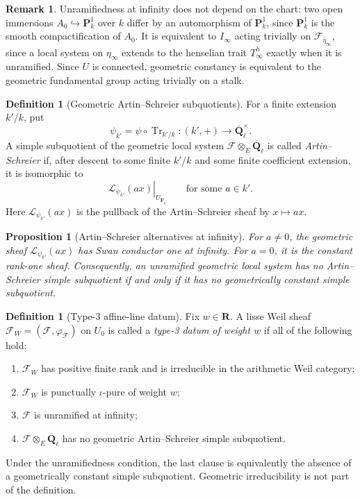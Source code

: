 \documentclass[10pt]{article}
\newtheorem{proposition}[theorem]{Proposition}
\theoremstyle{definition}
\newtheorem{definition}[theorem]{Definition}
\newtheorem{remark}[theorem]{Remark}
\newcommand{\Fbar}{\overline{\mathbf F}_q}
\newcommand{\Qlb}{\overline{\mathbf Q}_\ell}
\newcommand{\Pone}{\mathbf P^1}
\newcommand{\Tr}{\operatorname{Tr}}
\begin{document}
\begin{remark}
Unramifiedness at infinity does not depend on the chart: two open
immersions \(A_0\hookrightarrow\Pone_k\) over \(k\) differ by an
automorphism of \(\Pone_k\), since \(\Pone_k\) is the smooth
compactification of \(A_0\).  It is equivalent to \(I_\infty\) acting
trivially on \(\mathcal F_{\bar\eta_\infty}\), since a local system on
\(\eta_\infty\) extends to the henselian trait \(T_\infty^h\) exactly when it
is unramified.  Since \(U\) is connected, geometric constancy is equivalent
to the geometric fundamental group acting trivially on a stalk.
\end{remark}

\begin{definition}[Geometric Artin--Schreier subquotients]
For a finite extension \(k'/k\), put
\[
 \psi_{k'}=\psi\circ\Tr_{k'/k}:(k',+)\longrightarrow\Qlb^\times.
\]
A simple subquotient of the geometric local system
\(\mathcal F\otimes_E\Qlb\) is called \emph{Artin--Schreier} if, after
descent to some finite \(k'/k\) and some finite coefficient extension, it
is isomorphic to
\[
 \left.\mathcal L_{\psi_{k'}}(a x)\right|_{U_{\Fbar}}
 \qquad\text{for some }a\in k'.
\]
Here \(\mathcal L_{\psi_{k'}}(a x)\) is the pullback of the
Artin--Schreier sheaf by \(x\mapsto ax\).
\end{definition}

\begin{proposition}[Artin--Schreier alternatives at infinity]
For \(a\ne0\), the geometric sheaf
\(\mathcal L_{\psi_{k'}}(a x)\) has Swan conductor one at infinity.  For
\(a=0\), it is the constant rank-one sheaf.  Consequently, an unramified
geometric local system has no Artin--Schreier simple subquotient if and only
if it has no geometrically constant simple subquotient.
\end{proposition}

\begin{definition}[Type-3 affine-line datum]
Fix \(w\in\mathbf R\).  A lisse Weil sheaf
\(\mathcal F_W=(\mathcal F,\varphi_{\mathcal F})\) on \(U_0\) is called a
\emph{type-3 datum of weight \(w\)} if all of the following hold:
\begin{enumerate}
  \item \(\mathcal F_W\) has positive finite rank and is irreducible in the
  arithmetic Weil category;
  \item \(\mathcal F_W\) is punctually \(\iota\)-pure of weight \(w\);
  \item \(\mathcal F\) is unramified at infinity;
  \item \(\mathcal F\otimes_E\Qlb\) has no geometric
  Artin--Schreier simple subquotient.
\end{enumerate}
Under the unramifiedness condition, the last clause is equivalently the
absence of a geometrically constant simple subquotient.  Geometric
irreducibility is not part of the definition.
\end{definition}
\end{document}

